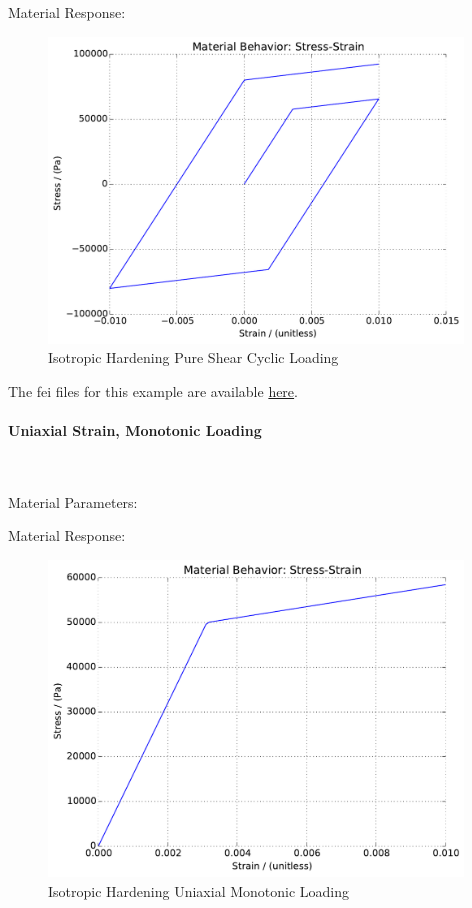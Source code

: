 \documentclass[fleqn,11pt]{article}
\begin{document}
Material Response:
\begin{figure}[H]
\begin{center}
\includegraphics[width=11cm]{../fei_examples/elastoplastic_isotropic_hardening/2pure_shear_cyclic_loading/result.pdf}
\caption{
\label{Isotropic Hardening Pure Shear Cyclic Loadin}
Isotropic Hardening Pure Shear Cyclic Loading}
\end{center}
\end{figure}

The fei files for this example are available \href{https://github.com/yuan-energy/education_examples/tree/master/fei_examples/isotropic_hardening_pure_shear/2pure_shear_cyclic_loading}{here}.

\newpage
\paragraph{Uniaxial Strain, Monotonic Loading} ~

Material Parameters:


Material Response:
\begin{figure}[H]
\begin{center}
\includegraphics[width=11cm]{../fei_examples/elastoplastic_isotropic_hardening/3uniaxial_strain_mono_loading/result.pdf}
\caption{
\label{Isotropic Hardening Uniaxial Monotonic Loading}
Isotropic Hardening Uniaxial Monotonic Loading}
\end{center}
\end{figure}
\end{document}

